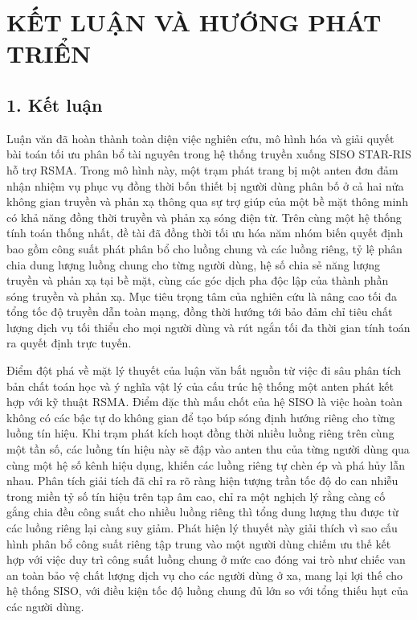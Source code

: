 \chapter*{KẾT LUẬN VÀ HƯỚNG PHÁT TRIỂN}

\section*{1. Kết luận}

Luận văn đã hoàn thành toàn diện việc nghiên cứu, mô hình hóa và giải quyết bài toán tối ưu phân bổ tài nguyên
trong hệ thống truyền xuống SISO STAR-RIS hỗ trợ RSMA. Trong mô hình này, một trạm phát trang bị một anten đơn
đảm nhận nhiệm vụ phục vụ đồng thời bốn thiết bị người dùng phân bố ở cả hai nửa không gian truyền và phản xạ
thông qua sự trợ giúp của một bề mặt thông minh có khả năng đồng thời truyền và phản xạ sóng điện từ. Trên cùng
một hệ thống tính toán thống nhất, đề tài đã đồng thời tối ưu hóa năm nhóm biến quyết định bao gồm công suất phát
phân bổ cho luồng chung và các luồng riêng, tỷ lệ phân chia dung lượng luồng chung cho từng người dùng, hệ số chia
sẻ năng lượng truyền và phản xạ tại bề mặt, cùng các góc dịch pha độc lập của thành phần sóng truyền và phản xạ.
Mục tiêu trọng tâm của nghiên cứu là nâng cao tối đa tổng tốc độ truyền dẫn toàn mạng, đồng thời hướng tới bảo đảm
chỉ tiêu chất lượng dịch vụ tối thiểu cho mọi người dùng và rút ngắn tối đa thời gian tính toán ra quyết định trực
tuyến.

Điểm đột phá về mặt lý thuyết của luận văn bắt nguồn từ việc đi sâu phân tích bản chất toán học và ý nghĩa vật lý
của cấu trúc hệ thống một anten phát kết hợp với kỹ thuật RSMA. Điểm đặc thù mấu chốt của hệ SISO là việc hoàn toàn
không có các bậc tự do không gian để tạo búp sóng định hướng riêng cho từng luồng tín hiệu. Khi trạm phát kích hoạt
đồng thời nhiều luồng riêng trên cùng một tần số, các luồng tín hiệu này sẽ đập vào anten thu của từng người dùng
qua cùng một hệ số kênh hiệu dụng, khiến các luồng riêng tự chèn ép và phá hủy lẫn nhau. Phân tích giải tích đã chỉ
ra rõ ràng hiện tượng trần tốc độ do can nhiễu trong miền tỷ số tín hiệu trên tạp âm cao, chỉ ra một nghịch lý rằng
càng cố gắng chia đều công suất cho nhiều luồng riêng thì tổng dung lượng thu được từ các luồng riêng lại càng suy
giảm. Phát hiện lý thuyết này giải thích vì sao cấu hình phân bổ công suất riêng tập trung vào một người dùng chiếm
ưu thế kết hợp với việc duy trì công suất luồng chung ở mức cao đóng vai trò như chiếc van an toàn bảo vệ chất
lượng dịch vụ cho các người dùng ở xa, mang lại lợi thế cho hệ thống SISO, với điều kiện tốc độ luồng chung đủ lớn so
với tổng thiếu hụt của các người dùng.

